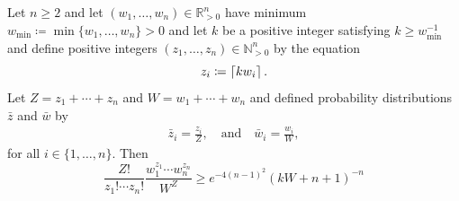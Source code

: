 \documentclass[notitlepage, 10pt]{article}
\begin{document}
\begin{lem}
    \label{lem:multinomial_dist_lower_bound}
    Let $n\geq 2$ and let $(w_1, \ldots, w_n) \in \mathbb R_{> 0}^{n}$ have minimum $w_{\min} \coloneqq \min\{ w_1, \ldots, w_n\} > 0$ and let $k$ be a positive integer satisfying $k \geq w_{\min}^{-1}$ and define positive integers $(z_1, \ldots, z_n) \in \mathbb N_{>0}^{n}$ by the equation
    \begin{equation}
        z_{i} \coloneqq \left\lceil kw_{i}\right\rceil.
    \end{equation}
    Let $Z = z_1+\cdots+z_n$ and $W = w_1 + \cdots + w_n$ and defined probability distributions $\bar z$ and $\bar w$ by
    \begin{align}
        \bar z_i = \frac{z_i}{Z}, 
        \quad \text{and} \quad 
        \bar w_i = \frac{w_i}{W},
    \end{align}
    for all $i \in \{1,\ldots, n\}$.
    Then
    \begin{equation}
        \label{eq:multinomial_dist_lower_bound}
        \frac{Z!}{z_1! \cdots z_n!}\frac{w_1^{z_{1}}\cdots w_{n}^{z_{n}}}{W^{Z}} \geq e^{-4(n-1)^2}(kW+n+1)^{-n}
    \end{equation}
\end{lem}
\end{document}
